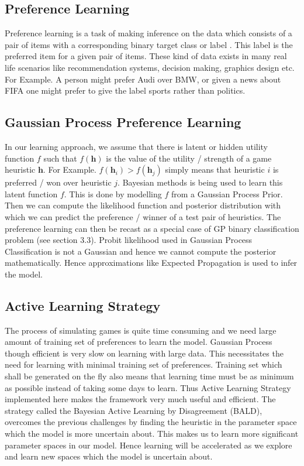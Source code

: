 \documentclass{scrartcl}
\begin{document}
\subsection{Preference Learning}
	Preference learning is a task of making inference on the data which consists of a pair of items with a corresponding binary target class or label \cite{chu2005preference}. This label is the preferred item for a given pair of items. These kind of data exists in many real life scenarios like recommendation systems, decision making, graphics design etc. For Example. A person might prefer Audi over BMW, or given a news about FIFA one might prefer to give the label sports rather than politics.
 
\subsection{Gaussian Process Preference Learning}
	In our learning approach, we assume that there is latent or hidden utility function $f$ such that $f(\mathbf{h})$ is the value of the utility / strength of a game heuristic $\mathbf{h}$. For Example. $f(\mathbf{h}_i) > f(\mathbf{h}_j)$ simply means that heuristic $i$ is preferred / won over heuristic $j$. Bayesian methods is being used to learn this latent function $f$. This is done by modelling $f$ from a Gaussian Process Prior. Then we can compute the likelihood function and posterior distribution with which we can predict the preference / winner of a test pair of heuristics. The preference learning can then be recast as a special case of GP binary classification problem (see section 3.3). Probit likelihood used in Gaussian Process Classification is not a Gaussian and hence we cannot compute the posterior mathematically.  Hence approximations like Expected Propagation is used to infer the model.

\subsection{Active Learning Strategy}
	The process of simulating games is quite time consuming and we need large amount of training set of preferences to learn the model. Gaussian Process though efficient is very slow on learning with large data. This necessitates the need for learning with minimal training set of preferences. Training set which shall be generated on the fly also means that learning time must be as minimum as possible instead of taking some days to learn. Thus Active Learning Strategy implemented here makes the framework very much useful and efficient. The strategy called the Bayesian Active Learning by Disagreement (BALD)\cite{houlsby2012collaborative}, overcomes the previous challenges by finding the heuristic in the parameter space which the model is more uncertain about. This makes us to learn more significant parameter spaces in our model. Hence learning will be accelerated as we explore and learn new spaces which the model is uncertain about.
\end{document}
